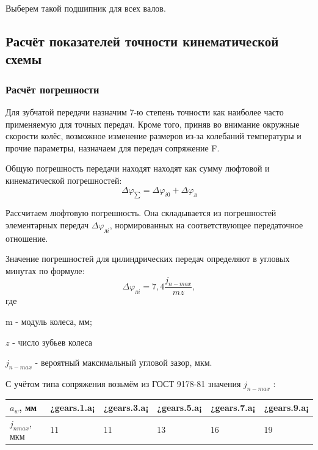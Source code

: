 \documentclass[14pt,a4paper,russian]{scrartcl}
\begin{document}
        Выберем такой подшипник для всех валов.

    
\subsection{Расчёт показателей точности кинематической схемы}
    \subsubsection{Расчёт погрешности}
        Для зубчатой передачи назначим 7-ю степень точности как 
        наиболее часто применяемую для точных передач. Кроме того, приняв во 
        внимание окружные скорости колёс, возможное изменение размеров
        из-за колебаний температуры и прочие параметры, назначаем
        для передач сопряжение F.\par

        Общую погрешность передачи находят находят как сумму люфтовой и
        кинематической погрешностей:
        \[ \Delta\varphi_{\sum} = \Delta\varphi_{i0}  + \Delta\varphi_{\text{л}}\]
        
        Рассчитаем люфтовую погрешность. Она складывается из погрешностей
        элементарных передач \( \Delta\varphi_{\text{л}i} \), нормированных
        на соответствующее передаточное отношение. \par 

        Значение погрешностей для цилиндрических передач определяют в
         угловых минутах по формуле:
         \[ \Delta\varphi_{\text{л}i} = 7,4\frac{j_{n-max}}{mz}, \]
         где\par \qquad m - модуль колеса, мм;\par
            \qquad\( z \) - число зубьев колеса\par
            \qquad\( j_{n-max} \) - вероятный максимальный угловой зазор, мкм.\par
        
        С учётом типа сопряжения возьмём из ГОСТ 9178-81 значения \( j_{n-max} \)   :
        \begin{table}[h!]
            \begin{center}
                \begin{tabular}{p{0.15\linewidth}|p{0.17\linewidth}p{0.17\linewidth}p{0.17\linewidth}p{0.17\linewidth}p{0.17\linewidth}}
                    \hline
                    \( a_w \), мм & ¿gears.1.a¡ & ¿gears.3.a¡ & ¿gears.5.a¡ & ¿gears.7.a¡ & ¿gears.9.a¡ \\
                    \hline
                    \( j_{n max} \), мкм & 11 & 11 & 13 & 16 & 19 \\
                    \hline
                \end{tabular}
            \end{center}
        \end{table}
\end{document}
